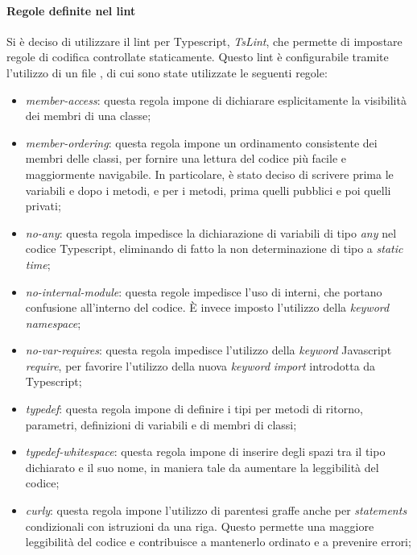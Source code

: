                 \paragraph*{Regole definite nel lint}
                Si \`e deciso di utilizzare il lint per Typescript, \textit{TsLint}, che permette di impostare regole di codifica controllate staticamente.
                Questo lint \`e configurabile tramite l'utilizzo di un file , di cui sono state utilizzate le seguenti regole:
                \begin{itemize}

                \item \textit{member-access}: questa regola impone di dichiarare esplicitamente la visibilit\`a dei membri di una classe;
                \item \textit{member-ordering}: questa regola impone un ordinamento consistente dei membri delle classi, per fornire una lettura del codice pi\`u facile e maggiormente navigabile. In particolare, \`e stato deciso di scrivere prima le variabili e dopo i metodi, e per i metodi, prima quelli pubblici e poi quelli privati;
                \item \textit{no-any}: questa regola impedisce la dichiarazione di variabili di tipo \textit{any} nel codice Typescript, eliminando di fatto la non determinazione di tipo a \textit{static time};
                \item \textit{no-internal-module}: questa regole impedisce l'uso di  interni, che portano confusione all'interno del codice. \`E invece imposto l'utilizzo della \textit{keyword} \textit{namespace};
                \item \textit{no-var-requires}: questa regola impedisce l'utilizzo della \textit{keyword} Javascript \textit{require}, per favorire l'utilizzo della nuova \textit{keyword} \textit{import} introdotta da Typescript;
                \item \textit{typedef}: questa regola impone di definire i tipi per metodi di ritorno, parametri, definizioni di variabili e di membri di classi;
                \item \textit{typedef-whitespace}: questa regola impone di inserire degli spazi tra il tipo dichiarato e il suo nome, in maniera tale da aumentare la leggibilit\`a del codice;
                \item \textit{curly}: questa regola impone l'utilizzo di parentesi graffe anche per \textit{statements} condizionali con istruzioni da una riga. Questo permette una maggiore leggibilit\`a del codice e contribuisce a mantenerlo ordinato e a prevenire errori;

\end{itemize}

